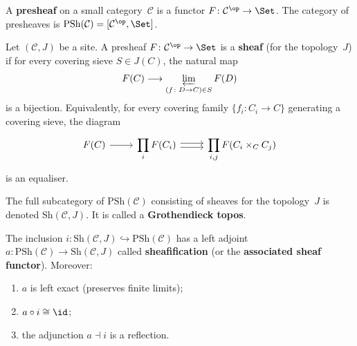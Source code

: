 
\begin{definition}[Presheaf]\label{def:presheaf-reminder}
A \textbf{presheaf} on a small category~$\mathcal{C}$ is a functor
$F\colon\mathcal{C}^{\op}\to\Set$.  The category of presheaves is
$\mathrm{PSh}(\mathcal{C}) = [\mathcal{C}^{\op}, \Set]$.
\end{definition}

\begin{definition}\label{def:sheaf-site}
Let $(\mathcal{C}, J)$ be a site.  A presheaf $F\colon\mathcal{C}^{\op}\to\Set$
is a \textbf{sheaf} (for the topology~$J$) if for every covering sieve
$S\in J(C)$, the natural map
\[
    F(C) \longrightarrow \varprojlim_{(f\colon D\to C)\in S} F(D)
\]
is a bijection.  Equivalently, for every covering family
$\{f_i\colon C_i\to C\}$ generating a covering sieve, the diagram
\[
\begin{tikzcd}
F(C) \arrow[r] &
\displaystyle\prod_i F(C_i)
  \arrow[r, shift left=0.5ex]
  \arrow[r, shift right=0.5ex] &
\displaystyle\prod_{i,j} F(C_i\times_C C_j)
\end{tikzcd}
\]
is an equaliser.
\end{definition}

\begin{definition}\label{def:sheaf-cat}
The full subcategory of $\mathrm{PSh}(\mathcal{C})$ consisting of
sheaves for the topology~$J$ is denoted
$\mathrm{Sh}(\mathcal{C}, J)$.  It is called a
\textbf{Grothendieck topos}.
\end{definition}

\begin{theorem}[Sheafification]\label{thm:sheafification}
The inclusion $i\colon\mathrm{Sh}(\mathcal{C},J)\hookrightarrow
\mathrm{PSh}(\mathcal{C})$ has a left adjoint
$a\colon\mathrm{PSh}(\mathcal{C})\to\mathrm{Sh}(\mathcal{C},J)$
called \textbf{sheafification} (or the \textbf{associated sheaf functor}).
Moreover:
\begin{enumerate}[label=(\alph*)]
\item $a$ is left exact (preserves finite limits);
\item $a\circ i \cong \id$;
\item the adjunction $a\dashv i$ is a reflection.
\end{enumerate}
\end{theorem}

